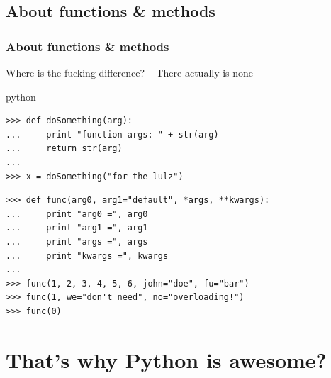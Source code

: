 \documentclass{beamer}
\begin{document}
\subsection{About functions \& methods}
\begin{frame}[fragile]
	\frametitle{About functions \& methods}
	Where is the fucking difference? \pause -- There actually is none \pause
	\begin{exampleblock}{python}
	\begin{lstlisting}
>>> def doSomething(arg):
... 	print "function args: " + str(arg)
... 	return str(arg)
...
>>> x = doSomething("for the lulz")
	\end{lstlisting}
	\pause	
	\begin{lstlisting}
>>> def func(arg0, arg1="default", *args, **kwargs):
... 	print "arg0 =", arg0
... 	print "arg1 =", arg1
... 	print "args =", args
... 	print "kwargs =", kwargs
...
>>> func(1, 2, 3, 4, 5, 6, john="doe", fu="bar")
>>> func(1, we="don't need", no="overloading!")
>>> func(0)
	\end{lstlisting}
	\end{exampleblock}
\end{frame}

\section{That's why Python is awesome?}
\end{document}
